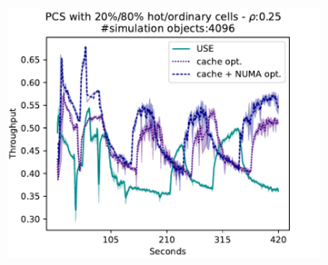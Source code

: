 \documentclass[]{article}
\begin{document}
\begin{figure}[!h]
\centering
\begin{subfigure}[b]{\mysize}
\centering
\includegraphics[width=\linewidth]{figures_original/results-pcs-dyn-0.48-pcs_hs-420-0.pdf}
\renewcommand{\thesubfigure}{Original}
\caption{}
\end{subfigure}


\end{figure}
\end{document}
